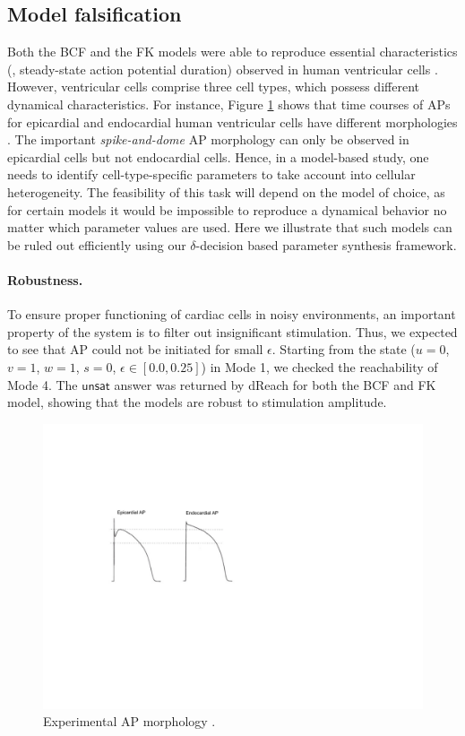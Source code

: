 \subsection{Model falsification}
Both the BCF and the FK models were able to reproduce essential characteristics (\eg, steady-state action potential duration) observed in human ventricular cells \cite{fenton98,orovio08}. However, ventricular cells comprise three cell types, which possess different dynamical characteristics. For instance, Figure \ref{ap} shows that time courses of APs for epicardial and endocardial human ventricular cells have different morphologies \cite{nabauer96}. The important \textit{spike-and-dome} AP morphology can only be observed in epicardial cells but not endocardial cells. Hence, in a model-based study, one needs to identify cell-type-specific parameters to take account into cellular heterogeneity. The feasibility of this task will depend on the model of choice, as for certain models it would be impossible to reproduce a dynamical behavior no matter which parameter values are used. Here we illustrate that such models can be ruled out efficiently using our $\delta$-decision based parameter synthesis framework.

\paragraph{Robustness.}
To ensure proper functioning of cardiac cells in noisy environments, an important property of the system is to filter out insignificant stimulation. Thus, we expected to see that AP could not be initiated for small $\epsilon$. Starting from the state ($u = 0$, $v = 1$, $w = 1$, $s = 0$, $\epsilon \in [0.0,0.25]$) in Mode 1, we checked the reachability of Mode 4. The $\mathsf{unsat}$ answer was returned by dReach for both the BCF and FK
model, showing that the models are robust to stimulation amplitude.

\begin{figure}[th]
\centering
\includegraphics[scale=0.8]{fig-ap}
\caption{Experimental AP morphology \cite{nabauer96}.}
\label{ap}
\end{figure}

